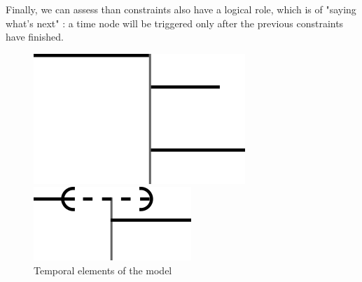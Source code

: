 \documentclass{sigchi}
\begin{document}
Finally, we can assess than constraints also have a logical role, which is of "saying what's next" : a time node will be triggered only after the previous constraints have finished.
\begin{figure}
	\centering
	\begin{minipage}[b]{.5\linewidth}
		\centering
		\includegraphics[scale=0.5]{images/timenode.png}
	\end{minipage}\begin{minipage}[b]{.5\linewidth}
		\centering
		\includegraphics[scale=0.5]{images/souple.png}
	\end{minipage}	
	
	\caption{Temporal elements of the model}
	\label{fig.cst.timenode}
\end{figure}	
\end{document}
